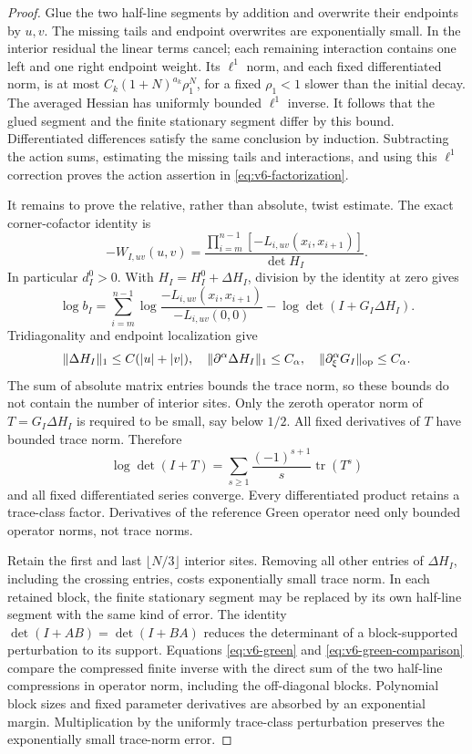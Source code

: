 \begin{proof}
Glue the two half-line segments by addition and overwrite their
endpoints by $u,v$. The missing tails and endpoint overwrites are
exponentially small. In the interior residual the linear terms cancel;
each remaining interaction contains one left and one right endpoint
weight. Its $\ell^1$ norm, and each fixed differentiated norm, is at most
$C_k(1+N)^{a_k}\rho_1^N$, for a fixed $\rho_1<1$ slower than the
initial decay. The averaged Hessian has uniformly bounded $\ell^1$
inverse. It follows that the glued segment and the finite stationary
segment differ by this bound. Differentiated differences satisfy the
same conclusion by induction. Subtracting the action sums, estimating
the missing tails and interactions, and using this $\ell^1$ correction
proves the action assertion in \eqref{eq:v6-factorization}.

It remains to prove the relative, rather than absolute, twist estimate.
The exact corner-cofactor identity is
\[
 -W_{I,uv}(u,v)
 =\frac{\prod_{i=m}^{n-1}[-L_{i,uv}(x_i,x_{i+1})]}{\det H_I}.
\]
In particular $d_I^0>0$. With $H_I=H_I^0+\Delta H_I$, division by the
identity at zero gives
\begin{equation}\label{eq:v6-relative-log}
 \log b_I=
 \sum_{i=m}^{n-1}\log\frac{-L_{i,uv}(x_i,x_{i+1})}{-L_{i,uv}(0,0)}
 -\log\det(I+G_I\Delta H_I).
\end{equation}
Tridiagonality and endpoint localization give
\[
 \|\Delta H_I\|_1\le C(|u|+|v|),\quad
 \|\partial^\alpha\Delta H_I\|_1\le C_\alpha,\quad
 \|\partial_\xi^\alpha G_I\|_{\rm op}\le C_\alpha.
\]
The sum of absolute matrix entries bounds the trace norm, so these
bounds do not contain the number of interior sites. Only the zeroth
operator norm of $T=G_I\Delta H_I$ is required to be small, say below
$1/2$. All fixed derivatives of $T$ have bounded trace norm. Therefore
\[
 \log\det(I+T)=\sum_{s\ge1}\frac{(-1)^{s+1}}s\operatorname{tr}(T^s)
\]
and all fixed differentiated series converge. Every differentiated
product retains a trace-class factor. Derivatives of the reference
Green operator need only bounded operator norms, not trace norms.

Retain the first and last $\lfloor N/3\rfloor$ interior sites.
Removing all other entries of $\Delta H_I$, including the crossing
entries, costs exponentially small trace norm. In each retained block,
the finite stationary segment may be replaced by its own half-line
segment with the same kind of error. The identity
$\det(I+AB)=\det(I+BA)$ reduces the determinant of a block-supported
perturbation to its support. Equations \eqref{eq:v6-green} and
\eqref{eq:v6-green-comparison} compare the compressed finite inverse
with the direct sum of the two half-line compressions in operator norm,
including the off-diagonal blocks. Polynomial block sizes and fixed
parameter derivatives are absorbed by an exponential margin.
Multiplication by the uniformly trace-class perturbation preserves the
exponentially small trace-norm error.


\end{proof}
